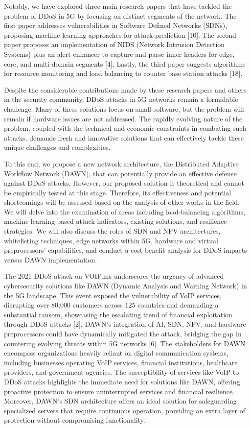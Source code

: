 \documentclass[conference]{IEEEtran}
\begin{document}
Notably, we have explored three main research papers that have tackled the problem of DDoS in 5G by focusing on distinct segments of the network. The first paper addresses vulnerabilities in Software Defined Networks (SDNs), proposing machine-learning approaches for attack prediction [10]. The second paper proposes an implementation of NIDS (Network Intrusion Detection Systems) plus an alert enhancer to capture and parse inner headers for edge, core, and multi-domain segments [4]. Lastly, the third paper suggests algorithms for resource monitoring and load balancing to counter base station attacks [18].

Despite the considerable contributions made by these research papers and others in the security community, DDoS attacks in 5G networks remain a formidable challenge. Many of these solutions focus on small software, but the problem will remain if hardware issues are not addressed. The rapidly evolving nature of the problem, coupled with the technical and economic constraints in combating such attacks, demands fresh and innovative solutions that can effectively tackle these unique challenges and complexities. 

To this end, we propose a new network architecture, the Distributed Adaptive Workflow Network (DAWN), that can potentially provide an effective defense against DDoS attacks. However, our proposed solution is theoretical and cannot be empirically tested at this stage. Therefore, its effectiveness and potential shortcomings will be assessed based on the analysis of other works in the field. We will delve into the examination of areas including load-balancing algorithms, machine learning-based attack indicators, existing solutions, and resilience strategies. We will also discuss the roles of SDN and NFV architectures, whitelisting techniques, edge networks within 5G, hardware and virtual preprocessors' capabilities, and conduct a cost-benefit analysis for DDoS impacts versus DAWN implementation.

The 2021 DDoS attack on VOIP.ms underscores the urgency of advanced cybersecurity solutions like DAWN (Dynamic Analysis and Warning Network) in the 5G landscape. This event exposed the vulnerability of VoIP services, disrupting over 80,000 customers across 125 countries and demanding a substantial ransom, showcasing the escalating trend of financial exploitation through DDoS attacks [2]. DAWN's integration of AI, SDN, NFV, and hardware preprocessors could have dynamically mitigated the attack, bridging the gap in countering evolving threats within 5G networks [6].
The stakeholders for DAWN encompass organizations heavily reliant on digital communication systems, including businesses operating VoIP services, financial institutions, healthcare providers, and government agencies. The susceptibility of services like VoIP to DDoS attacks highlights the immediate need for solutions like DAWN, offering proactive protection to ensure uninterrupted services and financial resilience. Moreover, DAWN's SDN architecture offers an ideal solution for safeguarding specialized servers that require continuous operation, providing an extra layer of protection without compromising functionality. 
\end{document}
